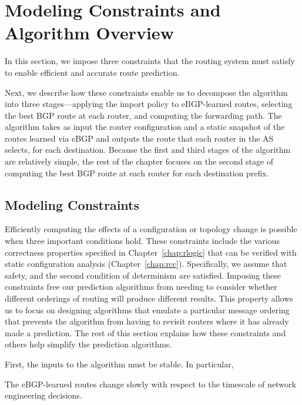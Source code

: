 

\section{Modeling Constraints and Algorithm Overview}
\label{sec:setup}
In this section, we impose three constraints that the routing system
must satisfy to enable efficient and accurate route prediction.  

Next, we describe how these constraints enable us to decompose the
algorithm into three stages---applying the import policy to eBGP-learned
routes, selecting the best BGP route at each router, and computing the
forwarding path.  The algorithm takes as input the router configuration
and a static snapshot of the routes learned via eBGP and outputs the
route that each router in the AS selects, for each destination.  Because
the first and third stages of the algorithm are relatively simple, the
rest of the chapter focuses on the second stage of computing the best
BGP route at each router for each destination prefix.



\subsection{Modeling Constraints}
Efficiently computing the effects of a configuration or topology change
is possible 
when three important conditions hold.  These constraints include the
various correctness properties specified in
Chapter~\ref{chap:rlogic} that can be verified with static configuration
analysis (Chapter~\ref{chap:rcc}).  Specifically, we assume that safety,
and the second condition of determinism are satisfied.  Imposing these
constraints free our prediction algorithms from needing to consider
whether different orderings of routing will produce different results.
This property allows us to focus on designing algorithms that emulate a
particular message ordering that prevents the algorithm from having to
revisit routers where it has already made a prediction.  The rest of
this section explains how these constraints and others help simplify the
prediction algorithms.

First, the inputs to the algorithm must be stable.  In particular,

\begin{constraint}
\label{a:ebgp}
The eBGP-learned routes change slowly with respect to the timescale of
network engineering decisions.
\end{constraint}

